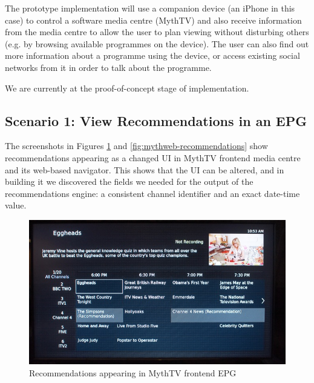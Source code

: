 \documentclass[]{article}%
\begin{document}
The prototype implementation will use a companion device (an iPhone in this case) to control a software media centre (MythTV) and also receive information from the media centre to allow the user to plan viewing without disturbing others (e.g. by browsing available programmes on the device). The user can also find out more information about a programme using the device, or access existing social networks from it in order to talk about the programme.

We are currently at the proof-of-concept stage of implementation.

\subsection{Scenario 1: View Recommendations in an EPG}

The screenshots in Figures \ref{fig:mythtv-recommendations} and \ref{fig:mythweb-recommendations} show recommendations appearing as a changed UI in MythTV frontend media centre and its web-based navigator. This shows that the UI can be altered, and in building it we discovered the fields we needed for the output of the recommendations engine: a consistent channel identifier and an exact date-time value.

\begin{figure}[htbp]
\begin{center}
\includegraphics[width=6in]{mythtv-recommendations.jpg}
\caption{Recommendations appearing in MythTV frontend EPG} \label{fig:mythtv-recommendations}
\end{center}
\end{figure}
\end{document}
